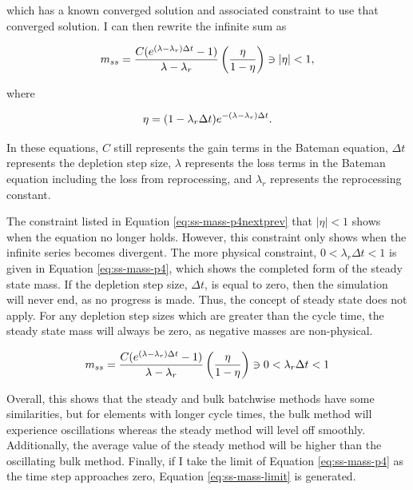 which has a known converged solution and associated constraint to use that converged solution. I can then rewrite the infinite sum as

\begin{equation} \hfill 
m_{ss} =  \frac{C (e^{(\lambda - \lambda_r) \Delta t} - 1)}{\lambda - \lambda_r}  \left( \frac{\eta}{1 - \eta} \right) \ni \left|\eta \right| < 1,
\hfill\label{eq:ss-mass-p4nextprev} \end{equation}

where

\begin{equation} \hfill 
\eta = (1 - \lambda_r \Delta t) e^{-(\lambda - \lambda_r) \Delta t}.
\hfill\label{eq:ss-mass-p4next-simple} \end{equation}

In these equations, $C$ still represents the gain terms in the Bateman equation, $\Delta t$ represents the depletion step size, $\lambda$ represents the loss terms in the Bateman equation including the loss from reprocessing, and $\lambda_r$ represents the reprocessing constant.

The constraint listed in Equation \eqref{eq:ss-mass-p4nextprev} that $\left|\eta \right| < 1$ shows when the equation no longer holds. However, this constraint only shows when the infinite series becomes divergent. The more physical constraint, $0 < \lambda_r \Delta t < 1$ is given in Equation \eqref{eq:ss-mass-p4}, which shows the completed form of the steady state mass. If the depletion step size, $\Delta t$, is equal to zero, then the simulation will never end, as no progress is made. Thus, the concept of steady state does not apply. For any depletion step sizes which are greater than the cycle time, the steady state mass will always be zero, as negative masses are non-physical.

\begin{equation} \hfill 
m_{ss} = \frac{C (e^{(\lambda - \lambda_r) \Delta t} - 1)}{\lambda - \lambda_r}  \left( \frac{\eta}{1 - \eta} \right) \ni 0 < \lambda_r \Delta t < 1
\hfill\label{eq:ss-mass-p4} \end{equation}



Overall, this shows that the steady and bulk batchwise methods have some similarities, but for elements with longer cycle times, the bulk method will experience oscillations whereas the steady method will level off smoothly. Additionally, the average value of the steady method will be higher than the oscillating bulk method. Finally, if I take the limit of Equation \eqref{eq:ss-mass-p4} as the time step approaches zero, Equation \eqref{eq:ss-mass-limit} is generated.

